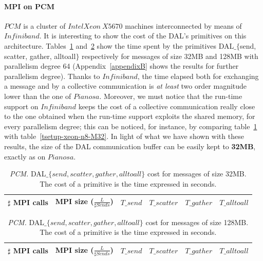 \paragraph{MPI on PCM}
$PCM$ is a cluster of $IntelXeon\ X5670$ machines interconnected by means of $Infiniband$. It is interesting to show the cost of the DAL's primitives on this architecture. Tables~\ref{tsetup-pcm-n64-M32} and~\ref{tsetup-pcm-n64-M128} show the time spent by the primitives DAL$\_\lbrace$send, scatter, gather, alltoall$\rbrace$ respectively for messages of size 32MB and 128MB with parallelism degree 64 (Appendix~\ref{appendixB} shows the results for further parallelism degree). Thanks to $Infiniband$, the time elapsed both for exchanging a message and by a collective communication is \textit{at least} two order magnitude lower than the one of $Pianosa$. Moreover, we must notice that the run-time support on $Infiniband$ keeps the cost of a collective communication really close to the one obtained when the run-time support exploits the shared memory, for every parallelism degree; this can be noticed, for instance, by comparing table~\ref{tsetup-pcm-n64-M32} with table~\ref{tsetup-xeon-n8-M32}. In light of what we have shown with these results, the size of the DAL communication buffer can be easily kept to \textbf{32MB}, exactly as on $Pianosa$.

\begin{table}[h]
\begin{center}
\begin{tabular}{|c|c|c|c|c|c|}\hline
\hline
$\sharp$ MPI calls & MPI size ($\frac{L}{\sharp Sends}$)  & $T\_send$   & $T\_scatter$  & $T\_gather$ & $T\_alltoall$      \\\hline\hline

\end{tabular}
\caption{\textit{PCM.} DAL$\_\lbrace send, scatter, gather, alltoall \rbrace$ cost for messages of size 32MB. The cost of a primitive is the time expressed in seconds. }
\label{tsetup-pcm-n64-M32}
\end{center}
\end{table}

\begin{table}[h]
\begin{center}
\begin{tabular}{|c|c|c|c|c|c|}\hline
\hline
$\sharp$ MPI calls & MPI size ($\frac{L}{\sharp Sends}$)  & $T\_send$   & $T\_scatter$  & $T\_gather$ & $T\_alltoall$      \\\hline\hline

\end{tabular}
\caption{\textit{PCM.} DAL$\_\lbrace send, scatter, gather, alltoall \rbrace$ cost for messages of size 128MB. The cost of a primitive is the time expressed in seconds.}
\label{tsetup-pcm-n64-M128}
\end{center}
\end{table}

